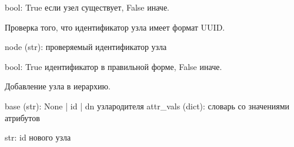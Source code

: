 \documentclass[a4paper,10pt,russian]{sphinxmanual}
\begin{document}
\begin{fulllineitems}
\begin{fulllineitems}
\begin{description}
\sphinxAtStartPar
bool: True \sphinxhyphen{} если узел существует, False \sphinxhyphen{} иначе.

\end{description}

\end{fulllineitems}



\begin{fulllineitems}

\pysigstartsignatures
{}
\pysigstopsignatures
\sphinxAtStartPar
Проверка того, что идентификатор узла
имеет формат UUID.
\begin{description}
\sphinxAtStartPar
node (str): проверяемый идентификатор узла

\sphinxAtStartPar
bool: True \sphinxhyphen{} идентификатор в правильной форме, False \sphinxhyphen{} иначе.

\end{description}

\end{fulllineitems}



\begin{fulllineitems}

\pysigstartsignatures
{}
\pysigstopsignatures
\sphinxAtStartPar
Добавление узла в иерархию.
\begin{description}
\sphinxAtStartPar
base (str): None | id | dn узла\sphinxhyphen{}родителя
attr\_vals (dict): словарь со значениями атрибутов

\sphinxAtStartPar
str: id нового узла

\end{description}


\end{fulllineitems}
\end{fulllineitems}
\end{document}
